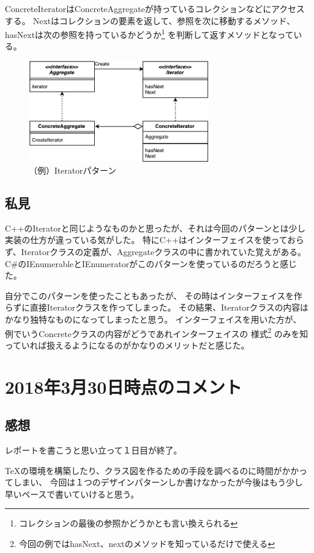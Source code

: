 \documentclass{jsarticle}
\begin{document}
		ConcreteIteratorはConcreteAggregateが持っているコレクションなどにアクセスする。
		Nextはコレクションの要素を返して、参照を次に移動するメソッド、
		hasNextは次の参照を持っているかどうか\footnote{コレクションの最後の参照かどうかとも言い換えられる}
		を判断して返すメソッドとなっている。
	
		\begin{figure}[htbp]
			\centering
			\includegraphics[width=0.7\textwidth]{IteratorPatan-crop.pdf}
			\caption{（例）Iteratorパターン}\label{fig::iterator}
		\end{figure}
		
	\subsection{私見}
		C++のIteratorと同じようなものかと思ったが、それは今回のパターンとは少し実装の仕方が違っている気がした。
		特にC++はインターフェイスを使っておらず、Iteratorクラスの定義が、Aggregateクラスの中に書かれていた覚えがある。
		C\#のIEnumerableとIEnumeratorがこのパターンを使っているのだろうと感じた。
		
		自分でこのパターンを使ったこともあったが、
		その時はインターフェイスを作らずに直接Iteratorクラスを作ってしまった。
		その結果、Iteratorクラスの内容はかなり独特なものになってしまったと思う。
		インターフェイスを用いた方が、例でいうConcreteクラスの内容がどうであれインターフェイスの
		様式\footnote{今回の例ではhasNext、nextのメソッドを知っているだけで使える}
		のみを知っていれば扱えるようになるのがかなりのメリットだと感じた。
	\section{2018年3月30日時点のコメント}
		\subsection{感想}
			レポートを書こうと思い立って１日目が終了。
			
			\TeX の環境を構築したり、クラス図を作るための手段を調べるのに時間がかかってしまい、
			今回は１つのデザインパターンしか書けなかったが今後はもう少し早いペースで書いていけると思う。
			
\end{document}
